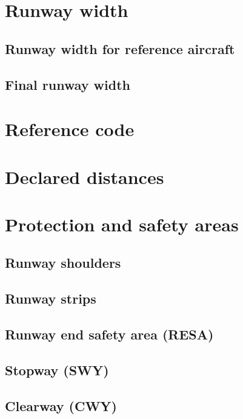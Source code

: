 	\section{Runway width}
		\subsection{Runway width for reference aircraft}
		\subsection{Final runway width}
		
	\section{Reference code}
	
	\section{Declared distances}
	
	\section{Protection and safety areas}
		\subsection{Runway shoulders}
		\subsection{Runway strips}
		\subsection{Runway end safety area (RESA)}
		\subsection{Stopway (SWY)}
		\subsection{Clearway (CWY)}
		